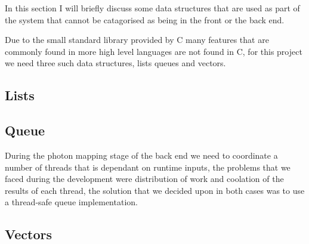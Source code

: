 In this section I will briefly discuss some data structures that are used as part of the system that cannot
be catagorised as being in the front or the back end.

Due to the small standard library provided by C many features that are commonly found in more high level languages are not
found in C, for this project we need three such data structures, lists queues and vectors.

\subsection{Lists}
\subsection{Queue}
During the photon mapping stage of the back end we need to coordinate a number of threads that is dependant on runtime inputs,
the problems that we faced during the development were distribution of work and coolation of the results of each thread,
the solution that we decided upon in both cases was to use a thread-safe queue implementation.

\subsection{Vectors}

